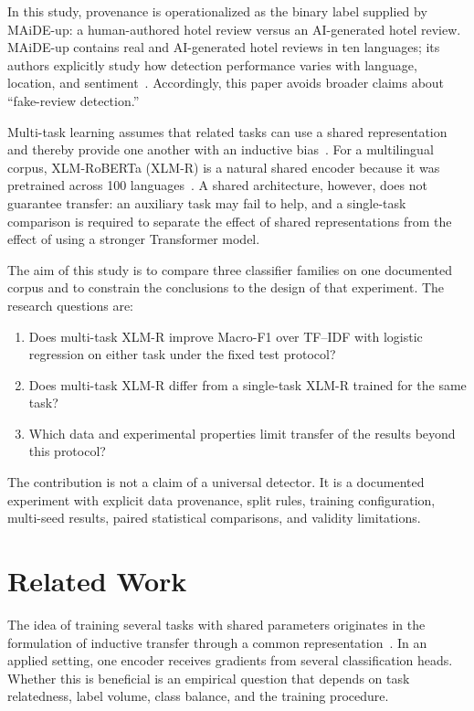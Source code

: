 \documentclass[11pt,a4paper]{article}
\begin{document}
In this study, provenance is operationalized as the binary label supplied by MAiDE-up: a human-authored hotel review versus an AI-generated hotel review. MAiDE-up contains real and AI-generated hotel reviews in ten languages; its authors explicitly study how detection performance varies with language, location, and sentiment~\cite{ignat2025maide}. Accordingly, this paper avoids broader claims about ``fake-review detection.''

Multi-task learning assumes that related tasks can use a shared representation and thereby provide one another with an inductive bias~\cite{caruana1997multitask}. For a multilingual corpus, XLM-RoBERTa (XLM-R) is a natural shared encoder because it was pretrained across 100 languages~\cite{conneau2020xlmr}. A shared architecture, however, does not guarantee transfer: an auxiliary task may fail to help, and a single-task comparison is required to separate the effect of shared representations from the effect of using a stronger Transformer model.

The aim of this study is to compare three classifier families on one documented corpus and to constrain the conclusions to the design of that experiment. The research questions are:
\begin{enumerate}[label=\textbf{RQ\arabic*.}, leftmargin=1.5cm]
  \item Does multi-task XLM-R improve Macro-F1 over TF--IDF with logistic regression on either task under the fixed test protocol?
  \item Does multi-task XLM-R differ from a single-task XLM-R trained for the same task?
  \item Which data and experimental properties limit transfer of the results beyond this protocol?
\end{enumerate}

The contribution is not a claim of a universal detector. It is a documented experiment with explicit data provenance, split rules, training configuration, multi-seed results, paired statistical comparisons, and validity limitations.

\section{Related Work}

The idea of training several tasks with shared parameters originates in the formulation of inductive transfer through a common representation~\cite{caruana1997multitask}. In an applied setting, one encoder receives gradients from several classification heads. Whether this is beneficial is an empirical question that depends on task relatedness, label volume, class balance, and the training procedure.
\end{document}
